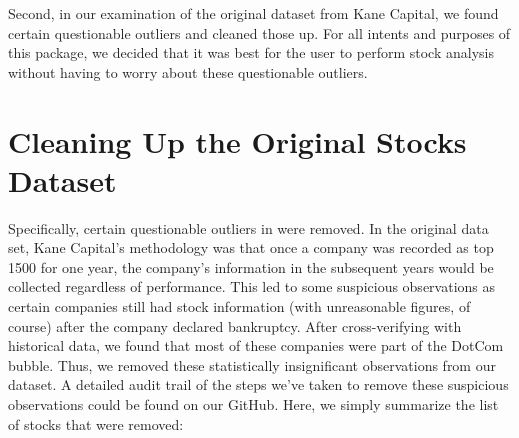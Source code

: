 Second, in our examination of the original dataset from Kane Capital, we found certain questionable outliers and cleaned those up. For all intents and purposes of this package, we decided that it was best for the user to perform stock analysis without having to worry about these questionable outliers. 

\section{Cleaning Up the Original Stocks Dataset}

Specifically, certain questionable outliers in  were removed. In the original data set, Kane Capital's methodology was that once a company was recorded as top 1500 for one year, the company's information in the subsequent years would be collected regardless of performance. This led to some suspicious observations as certain companies still had stock information (with unreasonable figures, of course) after the company declared bankruptcy. After cross-verifying with historical data, we found that most of these companies were part of the DotCom bubble. Thus, we removed these statistically insignificant observations from our dataset. A detailed audit trail of the steps we've taken to remove these suspicious observations could be found on our GitHub. Here, we simply summarize the list of stocks that were removed: \\

